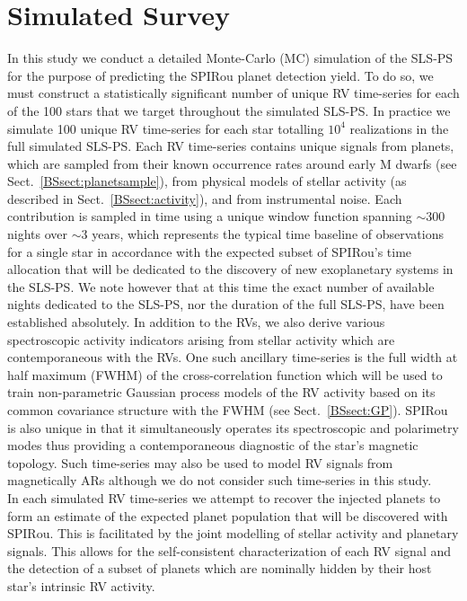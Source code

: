 \section{Simulated Survey} \label{BSsect:survey}
In this study we conduct a detailed Monte-Carlo (MC) simulation of the SLS-PS for the purpose of
predicting the SPIRou planet detection yield. To do so, we must construct a statistically significant
number of unique RV time-series for each of the 100 stars that we target throughout the simulated SLS-PS.
In practice we simulate 100 unique RV time-series for each star totalling $10^4$ realizations in the full
simulated SLS-PS. Each RV time-series contains unique signals from planets, which are sampled from their
known occurrence rates around early M dwarfs (see Sect.~\ref{BSsect:planetsample}), from physical models
of stellar activity (as described in Sect.~\ref{BSsect:activity}), and from instrumental noise.
Each contribution is sampled
in time using a unique window function spanning $\sim 300$ nights over $\sim 3$ years,
which represents the typical time baseline of observations for a single star
in accordance with the expected subset of SPIRou's time allocation that will be dedicated to the
discovery of new exoplanetary systems in the SLS-PS. We note however that at this time the exact number of available
nights dedicated to the SLS-PS, nor the duration of the full SLS-PS, have been established absolutely. In addition
to the RVs, we also derive various spectroscopic activity indicators arising from stellar activity
which are contemporaneous with the RVs. One such ancillary time-series is the full width at half maximum
(FWHM) of the cross-correlation function which will be used to
train non-parametric Gaussian process models of the RV activity based on its common covariance structure with
the FWHM (see Sect.~\ref{BSsect:GP}). SPIRou is also unique in that it simultaneously operates its spectroscopic and
polarimetry modes thus providing a contemporaneous diagnostic of the star's magnetic topology. Such time-series
may also
be used to model RV signals from magnetically ARs \citep{hebrard16} although we do not consider
such time-series in this study. \\

In each
simulated RV time-series we attempt to recover the injected planets to form an estimate of the expected
planet population that will be discovered with SPIRou. This is facilitated by the joint modelling of stellar
activity and planetary signals. This allows for the self-consistent characterization of each RV signal and the
detection of a subset of planets which are nominally hidden by their host star's intrinsic RV activity.


